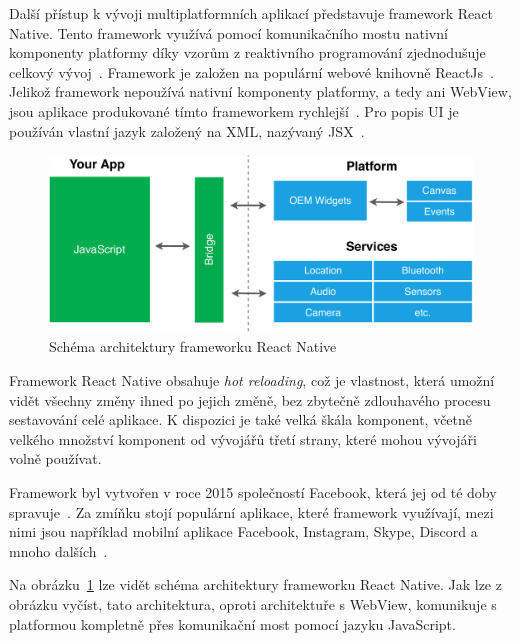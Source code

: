Další přístup k vývoji multiplatformních aplikací představuje framework
React Native.
Tento framework využívá pomocí komunikačního mostu nativní komponenty platformy
díky vzorům z reaktivního programování zjednodušuje celkový
vývoj~\cite{hackernoon_flutter}.
Framework je založen na populární webové
knihovně ReactJs~\cite{dashmagazine_mobile_frameworks}.
Jelikož framework nepoužívá nativní komponenty platformy,
a tedy ani WebView,
jsou aplikace produkované tímto frameworkem
rychlejší~\cite{dashmagazine_mobile_frameworks}.
Pro popis UI je používán vlastní jazyk založený na XML,
nazývaný JSX~\cite{dashmagazine_mobile_frameworks}.

\begin{figure}[ht!]
    \centering
    \includegraphics[width=\linewidth]{assets/technology-research/framework/react_native.pdf}
    \caption{Schéma architektury frameworku React Native~\cite{hackernoon_flutter}}
    \label{fig:framework_react_native}
\end{figure}

Framework React Native obsahuje \emph{hot reloading},
což je vlastnost,
která umožní vidět všechny změny ihned po jejich změně,
bez zbytečně zdlouhavého procesu sestavování celé aplikace.
K dispozici je také velká škála komponent,
včetně velkého množství komponent od vývojářů třetí strany, 
které mohou vývojáři volně používat.~\cite{dashmagazine_mobile_frameworks}

Framework byl vytvořen v roce 2015
společností Facebook,
která jej od té doby spravuje~\cite{hackernoon_flutter}.
Za zmíňku stojí populární aplikace,
které framework využívají,
mezi nimi jsou například mobilní aplikace Facebook, Instagram, Skype, Discord
a mnoho dalších~\cite{react_native}.

Na obrázku~\ref{fig:framework_react_native} lze vidět schéma architektury
frameworku React Native.
Jak lze z obrázku vyčíst,
tato architektura,
oproti architektuře s WebView,
komunikuje s platformou kompletně přes komunikační most pomocí jazyku
JavaScript.

